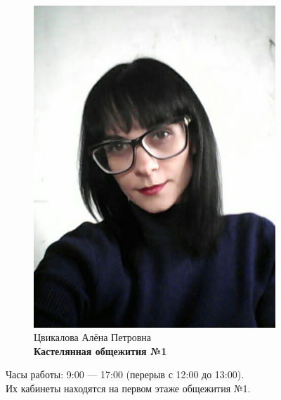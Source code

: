 \documentclass[14pt]{extarticle}
\begin{document}
\begin{figure}[h!]
\begin{subfigure}[b]{0.5\linewidth}
        \includegraphics[width=0.75\linewidth]{resources/cvik.jpg}
        \caption{Цвикалова Алёна Петровна \\ \textbf{Кастелянная общежития №1}}
    \end{subfigure}
    \caption{Часы работы: 9:00 — 17:00 (перерыв с 12:00 до 13:00). \\Их кабинеты находятся на первом этаже общежития №1.}
\end{figure}
\clearpage
\end{document}
